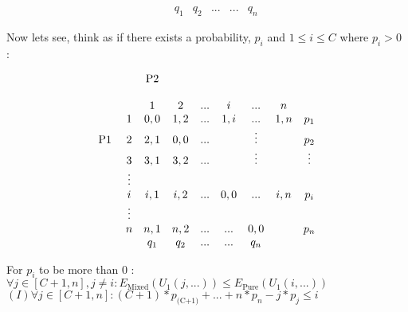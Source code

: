 \begin{enumerate}
\begin{latin}
\begin{center}
\begin{equation*}
\begin{matrix}
                                    &  & q_1 & q_2 & ... & ... & q_n 
                                      \end{matrix}
                                \end{equation*}
                           \end{center}
                           Now lets see, think as if there exists a probability, $p_i$ and $1 \leq i \leq C$ where $p_i > 0$ : 
                           \begin{center}
                            \begin{equation*}
                                        \begin{matrix}
                                              & & \text{P2}                  \\ \\ 
                                              & & 1 & 2 & ... & i & ... & n            \\
                                            & 1 & 0,0 & 1,2 & ... &1,i& ... & 1,n  & p_1         \\
                                            \text{P1} \hspace{1mm}& 2 & 2,1 & 0,0 & ... &  & \vdots && p_2   \\
                                            & 3 & 3,1 & 3,2 & ... & & \vdots & &\vdots\\
                                            & \vdots \\
                                            & i & i,1&i,2&...&0,0&...& i,n & p_i\\
                                            & \vdots \\
                                            & n & n,1 & n,2 & ... & ... & 0,0  && p_n \\
                                            &  & q_1 & q_2 & ... & ... & q_n 
                                              \end{matrix}
                                        \end{equation*}
                                   \end{center}
                                For $p_i$ to be more than 0 : \\
                                $\forall j \in [C+1,n] , j \neq i : E_\text{Mixed}(U_1(j,...)) \leq E_\text{Pure}(U_1(i,...))$\\
                                $(I)\forall j \in [C+1,n] : (C+1) * p_\text{(C+1)} + ... + n*p_n - j * p_j \leq i$\\ \\

\end{latin}
\end{enumerate}
